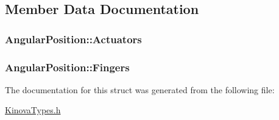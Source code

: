 \subsection{Member Data Documentation}
\hypertarget{struct_angular_position_a860d625d47a8a6eaae53f43903beb80b}{
\subsubsection[{Actuators}]{ Angular\-Position\-::\-Actuators}}\label{struct_angular_position_a860d625d47a8a6eaae53f43903beb80b}
\hypertarget{struct_angular_position_afdb2a9bede2dde4e8f881175a58e019f}{
\subsubsection[{Fingers}]{ Angular\-Position\-::\-Fingers}}\label{struct_angular_position_afdb2a9bede2dde4e8f881175a58e019f}


The documentation for this struct was generated from the following file\-:\begin{DoxyCompactItemize}
\item 
\hyperlink{_kinova_types_8h}{Kinova\-Types.\-h}\end{DoxyCompactItemize}
